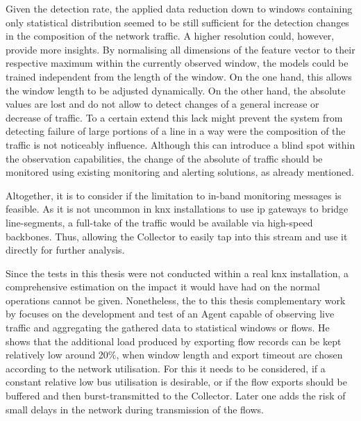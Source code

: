 Given the detection rate, the applied data reduction down to windows containing only statistical distribution seemed to be still sufficient for the detection changes in the composition of the network traffic. A higher resolution could, however, provide more insights.
By normalising all dimensions of the feature vector to their respective maximum within the currently observed window, the models could be trained independent from the length of the window. On the one hand, this allows the window length to be adjusted dynamically.
On the other hand, the absolute values are lost and do not allow to detect changes of a general increase or decrease of traffic. 
To a certain extend this lack might prevent the system from detecting failure of large portions of a line in a way were the composition of the traffic is not noticeably influence.
Although this can introduce a blind spot within the observation capabilities, the change of the absolute of traffic should be monitored using existing monitoring and alerting solutions, as already mentioned.

Altogether, it is to consider if the limitation to in-band monitoring messages is feasible. As it is not uncommon in \gls{knx} installations to use \gls{ip} gateways to bridge line-segments, a full-take of the traffic would be available via high-speed backbones. Thus, allowing the Collector to easily tap into this stream and use it directly for further analysis.

Since the tests in this thesis were not conducted within a real \gls{knx} installation, a comprehensive estimation on the impact it would have had on the normal operations cannot be given. %
Nonetheless, the to this thesis complementary work by \textcite{Jung2018} focuses on the development and test of an Agent capable of observing live traffic and aggregating the gathered data to statistical windows or flows.
He shows that the additional load produced by exporting flow records can be kept relatively low around 20\%, when window length and export timeout are chosen according to the network utilisation.
For this it needs to be considered, if a constant relative low bus utilisation is desirable, or if the flow exports should be buffered and then burst-transmitted to the Collector. Later one adds the risk of small delays in the network during transmission of the flows.

